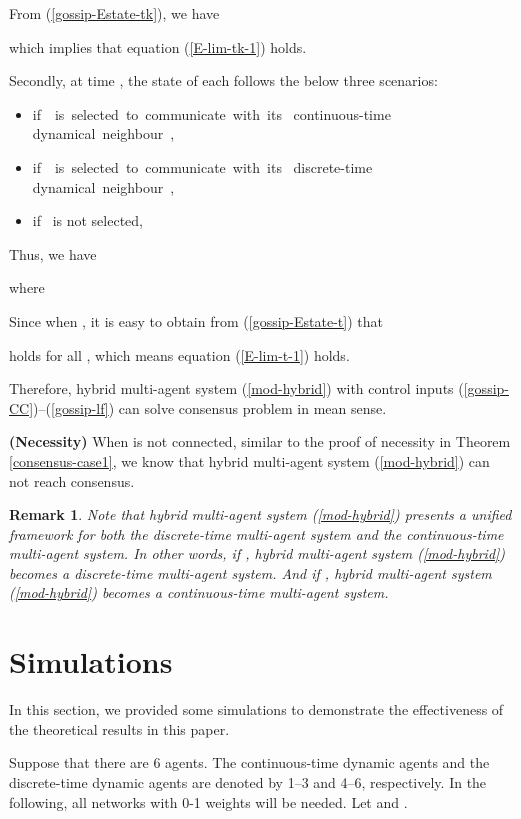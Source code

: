 \documentclass[12pt,draftcls,onecolumn]{IEEEtran}
\newtheorem{remark}{Remark}
\begin{document}
From (\ref{gossip-Estate-tk}), we have

which implies that equation (\ref{E-lim-tk-1}) holds.

Secondly, at time , the state of each  follows the below three scenarios:
\begin{itemize}
  \item if~~is~selected~to~communicate~with~its~ continuous-time dynamical~neighbour~, 
  \item if~~is~selected~to~communicate~with~its~ discrete-time dynamical~neighbour~,
  
  \item if~ is not selected, 
\end{itemize}
Thus, we have

where

Since  when , it is easy to obtain from (\ref{gossip-Estate-t}) that

holds for all , which means equation (\ref{E-lim-t-1}) holds.

Therefore, hybrid multi-agent system (\ref{mod-hybrid}) with control inputs (\ref{gossip-CC})--(\ref{gossip-lf}) can solve consensus problem in mean sense.

\textbf{(Necessity)} When  is not connected, similar to the proof of necessity in Theorem \ref{consensus-case1}, we know that hybrid multi-agent system (\ref{mod-hybrid}) can not reach consensus. 




\begin{remark}\label{unified}
Note that hybrid multi-agent system (\ref{mod-hybrid}) presents a unified framework for both the discrete-time multi-agent system and the continuous-time multi-agent system. In other words, if , hybrid multi-agent system (\ref{mod-hybrid}) becomes a discrete-time multi-agent system. And if , hybrid multi-agent system (\ref{mod-hybrid}) becomes a continuous-time multi-agent system.
\end{remark}
\section{Simulations }\label{s-Simulations}

In this section, we provided some simulations to demonstrate the effectiveness of the theoretical results in this paper.

Suppose that there are 6 agents. The continuous-time dynamic agents and the discrete-time dynamic agents are denoted by 1--3 and 4--6, respectively.
In the following, all networks with 0-1 weights will be needed. Let  and .
\end{document}
